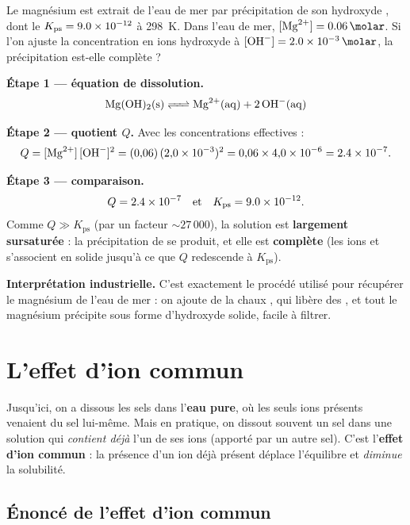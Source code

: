 \documentclass[11pt,a4paper]{article}
\newcommand{\Kps}{K_{\mathrm{ps}}}
\begin{document}
\begin{exemple}
Le magnésium est extrait de l'eau de mer par précipitation de son hydroxyde , dont le
$\Kps=\num{9{,}0e-12}$ à \qty{298}{\kelvin}. Dans l'eau de mer, $[\ce{Mg^{2+}}]=\qty{0{,}06}{\molar}$.
Si l'on ajuste la concentration en ions hydroxyde à $[\ce{OH-}]=\qty{2{,}0e-3}{\molar}$, la
précipitation est-elle complète ?

\smallskip
\textbf{Étape 1 — équation de dissolution.}
\[ \ce{Mg(OH)2(s) <=> Mg^{2+}(aq) + 2 OH^{-}(aq)} \]

\textbf{Étape 2 — quotient $Q$.} Avec les concentrations effectives :
\[ Q = [\ce{Mg^{2+}}]\,[\ce{OH-}]^{2}
     = (0{,}06)\,(2{,}0\times 10^{-3})^{2}
     = 0{,}06 \times 4{,}0\times 10^{-6}
     = \num{2{,}4e-7}. \]

\textbf{Étape 3 — comparaison.}
\[ Q = \num{2{,}4e-7} \quad\text{et}\quad \Kps = \num{9{,}0e-12}. \]
Comme $Q \gg \Kps$ (par un facteur $\sim 27\,000$), la solution est \textbf{largement sursaturée} :
la précipitation de  se produit, et elle est \textbf{complète} (les ions  et
 s'associent en solide jusqu'à ce que $Q$ redescende à $\Kps$).

\textbf{Interprétation industrielle.} C'est exactement le procédé utilisé pour récupérer le magnésium
de l'eau de mer : on ajoute de la chaux , qui libère des , et tout le magnésium
précipite sous forme d'hydroxyde  solide, facile à filtrer.
\end{exemple}

\section{L'effet d'ion commun}
Jusqu'ici, on a dissous les sels dans l'\textbf{eau pure}, où les seuls ions présents venaient du sel
lui-même. Mais en pratique, on dissout souvent un sel dans une solution qui \emph{contient déjà} l'un
de ses ions (apporté par un autre sel). C'est l'\textbf{effet d'ion commun} : la présence d'un ion
déjà présent déplace l'équilibre et \emph{diminue} la solubilité.

\subsection{Énoncé de l'effet d'ion commun}
\end{document}

